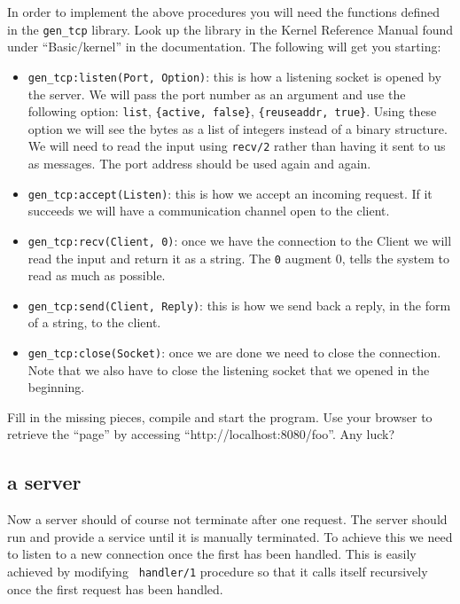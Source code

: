 \documentclass[a4paper, 11pt]{article}
\begin{document}
In order to implement the above procedures you will need the functions
defined in the {\tt gen\_tcp} library. Look up the library in the
Kernel Reference Manual found under ``Basic/kernel'' in the
documentation. The following will get you starting:

\begin{itemize} 

\item {\tt gen\_tcp:listen(Port, Option)}: this is how a listening
socket is opened by the server. We will pass the port number as an
argument and use the following option: {\tt list}, {\tt \{active,
false\}}, {\tt \{reuseaddr, true\}}. Using these option we will see the
bytes as a list of integers instead of a binary structure. We will
need to read the input using {\tt recv/2} rather than having it sent
to us as messages. The port address should be used again and again. 

\item {\tt gen\_tcp:accept(Listen)}: this is how we accept an incoming
request. If it succeeds we will have a communication channel open to
the client.

\item {\tt gen\_tcp:recv(Client, 0)}: once we have the connection to the
Client we will read the input and return it as a string. The {\tt 0}
augment 0, tells the system to read as much as possible.

\item {\tt gen\_tcp:send(Client, Reply)}: this is how we send back a reply,
in the form of a string, to the client.

\item {\tt gen\_tcp:close(Socket)}: once we are done we need to close the
connection. Note that we also have to close the listening socket that
we opened in the beginning.
\end{itemize}

Fill in the missing pieces, compile and start the program. Use your
browser to retrieve the ``page'' by accessing
``http://localhost:8080/foo''. Any luck?

\subsection{a server}

Now a server should of course not terminate after one request. The
server should run and provide a service until it is manually
terminated. To achieve this we need to listen to a new connection once
the first has been handled. This is easily achieved by modifying {\tt
  handler/1} procedure so that it calls itself recursively once the
first request has been handled.
\end{document}
